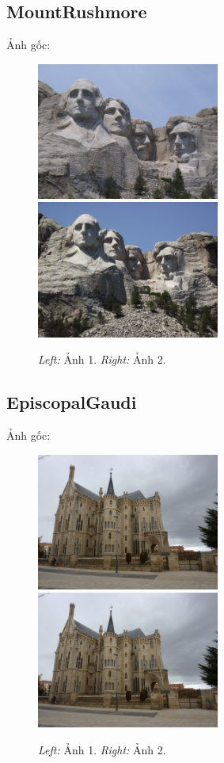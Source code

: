 \documentclass[11pt]{article}
\begin{document}
\subsection*{MountRushmore}
Ảnh gốc:
\begin{figure}[H]
    \centering
    \includegraphics[width=6cm]{images/MountRushmore/Mount_Rushmore1.jpg}
    \includegraphics[width=6cm]{images/MountRushmore/Mount_Rushmore2.jpg}
    \caption{\emph{Left:} Ảnh 1. \emph{Right:} Ảnh 2.}
\end{figure}


\subsection*{EpiscopalGaudi}
Ảnh gốc:
\begin{figure}[H]
    \centering
    \includegraphics[width=6cm]{images/EpiscopalGaudi/EGaudi_1.jpg}
    \includegraphics[width=6cm]{images/EpiscopalGaudi/EGaudi_1.jpg}
    \caption{\emph{Left:} Ảnh 1. \emph{Right:} Ảnh 2.}
\end{figure}
\end{document}
